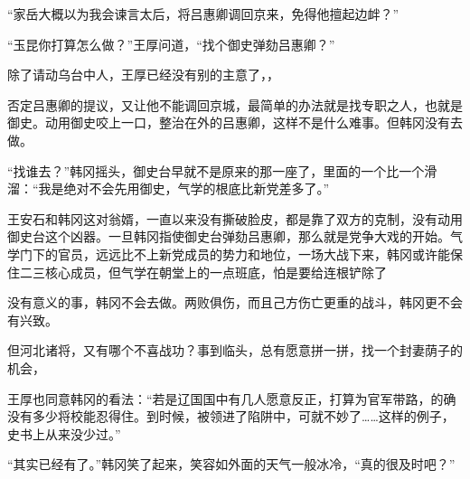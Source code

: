 “家岳大概以为我会谏言太后，将吕惠卿调回京来，免得他擅起边衅？”

“玉昆你打算怎么做？”王厚问道，“找个御史弹劾吕惠卿？”

除了请动乌台中人，王厚已经没有别的主意了，，

否定吕惠卿的提议，又让他不能调回京城，最简单的办法就是找专职之人，也就是御史。动用御史咬上一口，整治在外的吕惠卿，这样不是什么难事。但韩冈没有去做。

“找谁去？”韩冈摇头，御史台早就不是原来的那一座了，里面的一个比一个滑溜：“我是绝对不会先用御史，气学的根底比新党差多了。”

王安石和韩冈这对翁婿，一直以来没有撕破脸皮，都是靠了双方的克制，没有动用御史台这个凶器。一旦韩冈指使御史台弹劾吕惠卿，那么就是党争大戏的开始。气学门下的官员，远远比不上新党成员的势力和地位，一场大战下来，韩冈或许能保住二三核心成员，但气学在朝堂上的一点班底，怕是要给连根铲除了

没有意义的事，韩冈不会去做。两败俱伤，而且己方伤亡更重的战斗，韩冈更不会有兴致。

但河北诸将，又有哪个不喜战功？事到临头，总有愿意拼一拼，找一个封妻荫子的机会，

王厚也同意韩冈的看法：“若是辽国国中有几人愿意反正，打算为官军带路，的确没有多少将校能忍得住。到时候，被领进了陷阱中，可就不妙了……这样的例子，史书上从来没少过。”

“其实已经有了。”韩冈笑了起来，笑容如外面的天气一般冰冷，“真的很及时吧？”
